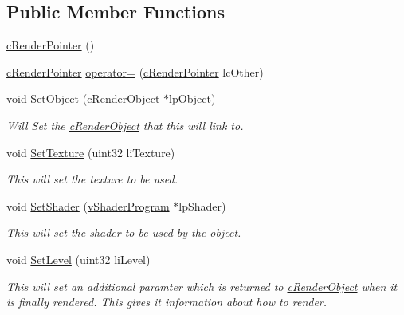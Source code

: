 \subsection*{Public Member Functions}
\begin{DoxyCompactItemize}
\item 
\hyperlink{classc_render_pointer_ac8440aadd57f91b393e2d87a131f99f5}{cRenderPointer} ()
\item 
\hyperlink{classc_render_pointer}{cRenderPointer} \hyperlink{classc_render_pointer_a7c2df45fd3b6b596931a8db17cdd86fe}{operator=} (\hyperlink{classc_render_pointer}{cRenderPointer} lcOther)
\item 
void \hyperlink{classc_render_pointer_a896535cf0d3f8282aac2c2a1694f554e}{SetObject} (\hyperlink{classc_render_object}{cRenderObject} $\ast$lpObject)
\begin{DoxyCompactList}\small\item\em Will Set the \hyperlink{classc_render_object}{cRenderObject} that this will link to. \item\end{DoxyCompactList}\item 
void \hyperlink{classc_render_pointer_a88cbb0a066b78cba25575e7dbe456c39}{SetTexture} (uint32 liTexture)
\begin{DoxyCompactList}\small\item\em This will set the texture to be used. \item\end{DoxyCompactList}\item 
void \hyperlink{classc_render_pointer_adefd398d6a04a2ceb24d34d9030723ca}{SetShader} (\hyperlink{classv_shader_program}{vShaderProgram} $\ast$lpShader)
\begin{DoxyCompactList}\small\item\em This will set the shader to be used by the object. \item\end{DoxyCompactList}\item 
void \hyperlink{classc_render_pointer_a0c54f19539eed59d0094b0a01e7752c3}{SetLevel} (uint32 liLevel)
\begin{DoxyCompactList}\small\item\em This will set an additional paramter which is returned to \hyperlink{classc_render_object}{cRenderObject} when it is finally rendered. This gives it information about how to render. \item\end{DoxyCompactList}\item 

\end{DoxyCompactItemize}
